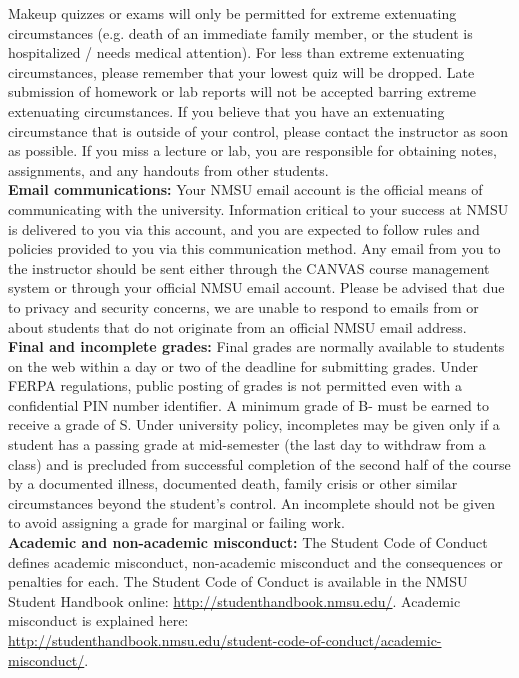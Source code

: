 \documentclass{article}
\begin{document}
\noindent Makeup quizzes or exams will only be permitted for extreme extenuating circumstances (e.g. death of an immediate family member, or the student is hospitalized / needs medical attention). For less than extreme extenuating circumstances, please remember that your lowest quiz will be dropped. Late submission of homework or lab reports will not be accepted barring extreme extenuating circumstances. If you believe that you have an extenuating circumstance that is outside of your control, please contact the instructor as soon as possible. If you miss a lecture or lab, you are responsible for obtaining notes, assignments, and any handouts from other students. \\

\noindent\textbf{Email communications:} Your NMSU email account is the official means of communicating with the university.  Information critical to your success at NMSU is delivered to you via this account, and you are expected to follow rules and policies provided to you via this communication method.  Any email from you to the instructor should be sent either through the CANVAS course management system or through your official NMSU email account. Please be advised that due to privacy and security concerns, we are unable to respond to emails from or about students that do not originate from an official NMSU email address. \\

\noindent\textbf{Final and incomplete grades:} Final grades are normally available to students on the web within a day or two of the deadline for submitting grades. Under FERPA regulations, public posting of grades is not permitted even with a confidential PIN number identifier. A minimum grade of B- must be earned to receive a grade of S. Under university policy, incompletes may be given only if a student has a passing grade at mid-semester (the last day to withdraw from a class) and is precluded from successful completion of the second half of the course by a documented illness, documented death, family crisis or other similar circumstances beyond the student's control. An incomplete should not be given to avoid assigning a grade for marginal or failing work. \\

\noindent\textbf{Academic and non-academic misconduct:}
The Student Code of Conduct defines academic misconduct, non-academic misconduct and the consequences or penalties for each.  The Student Code of Conduct is available in the NMSU Student Handbook online:  \url{http://studenthandbook.nmsu.edu/}. Academic misconduct is explained here: \\ \url{http://studenthandbook.nmsu.edu/student-code-of-conduct/academic-misconduct/}. \\
\end{document}
